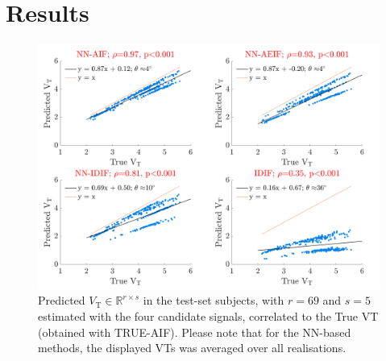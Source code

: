 \vspace{-0.5cm}

\section{Results} \label{sec:results}
    \begin{figure}
        \vspace{-0.5cm}
        
        \centering
        
        \includegraphics[width=1.0\linewidth]{Figures/correlation.png}
        
        \vspace{-0.25cm}
        
        \captionsetup{singlelinecheck=false, justification=centering}
        \caption{
            \scriptsize
            Predicted $V_{\mathrm{T}} \in \mathbb{R}^{r \times s}$ in the test-set subjects, with $r = 69$ and $s=5$ estimated with the four candidate signals, correlated to the True \gls{VT} (obtained with TRUE-\gls{AIF}). Please note that for the \gls{NN}-based methods, the displayed \glspl{VT} was averaged over all realisations.
        }
        
        \label{fig:correlation}
        
       \vspace{-0.5cm}
   \end{figure}

